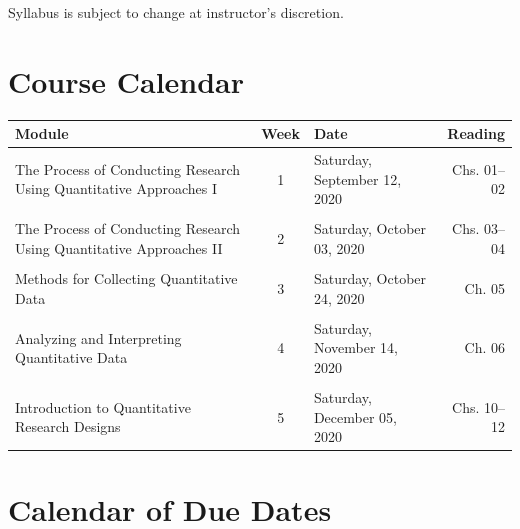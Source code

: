 \documentclass[
]{article}
\begin{document}
Syllabus is subject to change at instructor's discretion.

\newpage

\section{Course Calendar}

\begin{tabularx}{\linewidth}{XcXr}
\hline
\textbf{Module} & \textbf{Week} & \textbf{Date} & \textbf{Reading} \\
\hline

The Process of Conducting Research Using Quantitative Approaches I & 1 & Saturday, September 12, 2020 & Chs. 01--02 \\
 &  &  &  \\
 
The Process of Conducting Research Using Quantitative Approaches II & 2 & Saturday, October 03, 2020 & Chs. 03--04 \\
 &  &  & \\
 
Methods for Collecting Quantitative Data & 3 & Saturday, October 24, 2020 & Ch. 05 \\
 &  &  & \\
 
Analyzing and Interpreting Quantitative Data & 4 & Saturday, November 14, 2020 & Ch. 06 \\
 &  &  &  \\
 
Introduction to Quantitative Research Designs & 5 & Saturday, December 05, 2020 & Chs. 10--12 \\
\hline
\end{tabularx}

\newpage
\section{Calendar of Due Dates}
\end{document}
